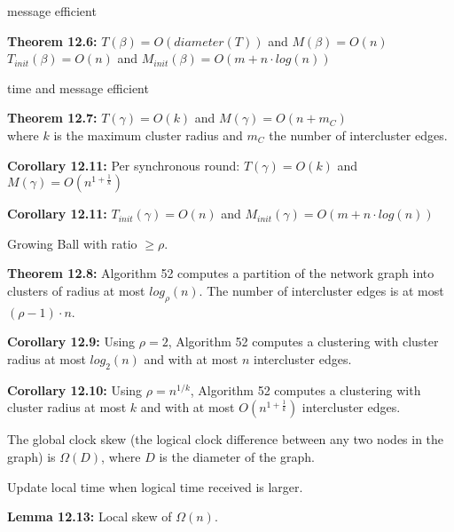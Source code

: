 {
	\begin{items}
		\item message efficient
		\item {\bf Theorem 12.6:} $T(\beta)=O(diameter(T))$ and $M(\beta)=O(n)$\\
			$T_{init}(\beta)=O(n)$ and $M_{init}(\beta)=O(m+n\cdot log(n))$
	\end{items}
}

{
	\begin{items}
		\item time and message efficient
		\item {\bf Theorem 12.7:} $T(\gamma)=O(k)$ and $M(\gamma)=O(n+m_C)$\\
			where $k$ is the maximum cluster radius and $m_C$ the number of intercluster edges.
		\item {\bf Corollary 12.11:} Per synchronous round: $T(\gamma)=O(k)$ and $M(\gamma)=O(n^{1+\frac{1}{k}})$
		\item {\bf Corollary 12.11:} $T_{init}(\gamma)=O(n)$ and $M_{init}(\gamma)=O(m+n\cdot log(n))$
	\end{items}
}

{
	\begin{items}
		\item Growing Ball with ratio $\ge\rho$.
		\item {\bf Theorem 12.8:} Algorithm 52 computes a partition of the network graph into 
		clusters of radius at most $log_{\rho}(n)$. The number of intercluster edges is at 
		most $(\rho -1)\cdot n$.
		\item {\bf Corollary 12.9:} Using $\rho=2$, Algorithm 52 computes a clustering with 
		cluster radius at most $log_2(n)$ and with at most $n$ intercluster edges.
		\item {\bf Corollary 12.10:} Using $\rho=n^{1/k}$, Algorithm 52 computes a clustering with 
		cluster radius at most $k$ and with at most $O(n^{1+\frac{1}{k}})$ intercluster edges.
	\end{items}
}

{
	The global clock skew (the logical clock difference between any two nodes in the graph) is 
	$\Omega(D)$, where $D$ is the diameter of the graph.
}

{
	\begin{items}
		\item Update local time when logical time received is larger.
		\item {\bf Lemma 12.13:} Local skew of $\Omega(n)$.
	\end{items}
}


